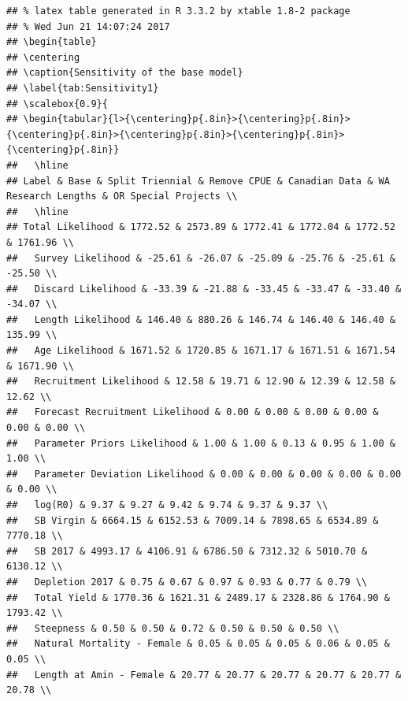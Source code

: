 \documentclass[10pt,]{article}
\begin{document}
\begin{verbatim}
## % latex table generated in R 3.3.2 by xtable 1.8-2 package
## % Wed Jun 21 14:07:24 2017
## \begin{table}
## \centering
## \caption{Sensitivity of the base model} 
## \label{tab:Sensitivity1}
## \scalebox{0.9}{
## \begin{tabular}{l>{\centering}p{.8in}>{\centering}p{.8in}>{\centering}p{.8in}>{\centering}p{.8in}>{\centering}p{.8in}>{\centering}p{.8in}}
##   \hline
## Label & Base & Split Triennial & Remove CPUE & Canadian Data & WA Research Lengths & OR Special Projects \\ 
##   \hline
## Total Likelihood & 1772.52 & 2573.89 & 1772.41 & 1772.04 & 1772.52 & 1761.96 \\ 
##   Survey Likelihood & -25.61 & -26.07 & -25.09 & -25.76 & -25.61 & -25.50 \\ 
##   Discard Likelihood & -33.39 & -21.88 & -33.45 & -33.47 & -33.40 & -34.07 \\ 
##   Length Likelihood & 146.40 & 880.26 & 146.74 & 146.40 & 146.40 & 135.99 \\ 
##   Age Likelihood & 1671.52 & 1720.85 & 1671.17 & 1671.51 & 1671.54 & 1671.90 \\ 
##   Recruitment Likelihood & 12.58 & 19.71 & 12.90 & 12.39 & 12.58 & 12.62 \\ 
##   Forecast Recruitment Likelihood & 0.00 & 0.00 & 0.00 & 0.00 & 0.00 & 0.00 \\ 
##   Parameter Priors Likelihood & 1.00 & 1.00 & 0.13 & 0.95 & 1.00 & 1.00 \\ 
##   Parameter Deviation Likelihood & 0.00 & 0.00 & 0.00 & 0.00 & 0.00 & 0.00 \\ 
##   log(R0) & 9.37 & 9.27 & 9.42 & 9.74 & 9.37 & 9.37 \\ 
##   SB Virgin & 6664.15 & 6152.53 & 7009.14 & 7898.65 & 6534.89 & 7770.18 \\ 
##   SB 2017 & 4993.17 & 4106.91 & 6786.50 & 7312.32 & 5010.70 & 6130.12 \\ 
##   Depletion 2017 & 0.75 & 0.67 & 0.97 & 0.93 & 0.77 & 0.79 \\ 
##   Total Yield & 1770.36 & 1621.31 & 2489.17 & 2328.86 & 1764.90 & 1793.42 \\ 
##   Steepness & 0.50 & 0.50 & 0.72 & 0.50 & 0.50 & 0.50 \\ 
##   Natural Mortality - Female & 0.05 & 0.05 & 0.05 & 0.06 & 0.05 & 0.05 \\ 
##   Length at Amin - Female & 20.77 & 20.77 & 20.77 & 20.77 & 20.77 & 20.78 \\ 

\end{verbatim}
\end{document}
